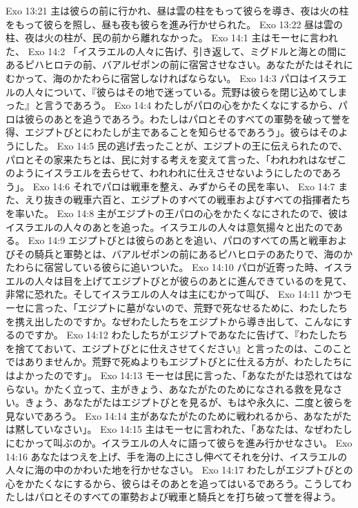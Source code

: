 Exo 13:21  主は彼らの前に行かれ、昼は雲の柱をもって彼らを導き、夜は火の柱をもって彼らを照し、昼も夜も彼らを進み行かせられた。
Exo 13:22  昼は雲の柱、夜は火の柱が、民の前から離れなかった。
Exo 14:1  主はモーセに言われた、
Exo 14:2  「イスラエルの人々に告げ、引き返して、ミグドルと海との間にあるピハヒロテの前、バアルゼポンの前に宿営させなさい。あなたがたはそれにむかって、海のかたわらに宿営しなければならない。
Exo 14:3  パロはイスラエルの人々について、『彼らはその地で迷っている。荒野は彼らを閉じ込めてしまった』と言うであろう。
Exo 14:4  わたしがパロの心をかたくなにするから、パロは彼らのあとを追うであろう。わたしはパロとそのすべての軍勢を破って誉を得、エジプトびとにわたしが主であることを知らせるであろう」。彼らはそのようにした。
Exo 14:5  民の逃げ去ったことが、エジプトの王に伝えられたので、パロとその家来たちとは、民に対する考えを変えて言った、「われわれはなぜこのようにイスラエルを去らせて、われわれに仕えさせないようにしたのであろう」。
Exo 14:6  それでパロは戦車を整え、みずからその民を率い、
Exo 14:7  また、えり抜きの戦車六百と、エジプトのすべての戦車およびすべての指揮者たちを率いた。
Exo 14:8  主がエジプトの王パロの心をかたくなにされたので、彼はイスラエルの人々のあとを追った。イスラエルの人々は意気揚々と出たのである。
Exo 14:9  エジプトびとは彼らのあとを追い、パロのすべての馬と戦車およびその騎兵と軍勢とは、バアルゼポンの前にあるピハヒロテのあたりで、海のかたわらに宿営している彼らに追いついた。
Exo 14:10  パロが近寄った時、イスラエルの人々は目を上げてエジプトびとが彼らのあとに進んできているのを見て、非常に恐れた。そしてイスラエルの人々は主にむかって叫び、
Exo 14:11  かつモーセに言った、「エジプトに墓がないので、荒野で死なせるために、わたしたちを携え出したのですか。なぜわたしたちをエジプトから導き出して、こんなにするのですか。
Exo 14:12  わたしたちがエジプトであなたに告げて、『わたしたちを捨てておいて、エジプトびとに仕えさせてください』と言ったのは、このことではありませんか。荒野で死ぬよりもエジプトびとに仕える方が、わたしたちにはよかったのです」。
Exo 14:13  モーセは民に言った、「あなたがたは恐れてはならない。かたく立って、主がきょう、あなたがたのためになされる救を見なさい。きょう、あなたがたはエジプトびとを見るが、もはや永久に、二度と彼らを見ないであろう。
Exo 14:14  主があなたがたのために戦われるから、あなたがたは黙していなさい」。
Exo 14:15  主はモーセに言われた、「あなたは、なぜわたしにむかって叫ぶのか。イスラエルの人々に語って彼らを進み行かせなさい。
Exo 14:16  あなたはつえを上げ、手を海の上にさし伸べてそれを分け、イスラエルの人々に海の中のかわいた地を行かせなさい。
Exo 14:17  わたしがエジプトびとの心をかたくなにするから、彼らはそのあとを追ってはいるであろう。こうしてわたしはパロとそのすべての軍勢および戦車と騎兵とを打ち破って誉を得よう。
